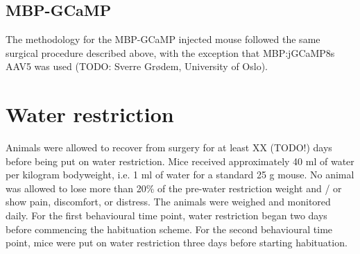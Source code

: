 \subsection{MBP-GCaMP}
The methodology for the MBP-GCaMP injected mouse followed the same surgical procedure described above, with the exception that MBP:jGCaMP8s AAV5 was used (TODO: Sverre Grødem, University of Oslo).
\section{Water restriction}
Animals were allowed to recover from surgery for at least XX (TODO!) days before being put on water restriction. Mice received approximately 40 ml of water per kilogram bodyweight, i.e. 1 ml of water for a standard 25 g mouse. No animal was allowed to lose more than 20\% of the pre-water restriction weight and / or show pain, discomfort, or distress. The animals were weighed and monitored daily.
For the first behavioural time point, water restriction began two days before commencing the habituation scheme. For the second behavioural time point, mice were put on water restriction three days before starting habituation.
